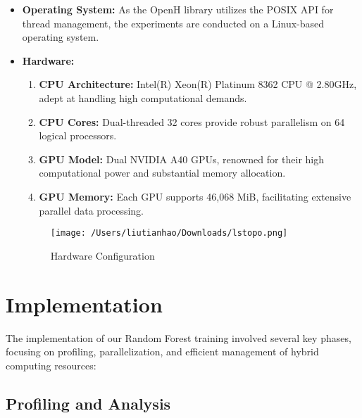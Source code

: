 \documentclass[11.5pt]{article}
\begin{document}
\begin{itemize}
    \item \textbf{Operating System:}
    As the OpenH library utilizes the POSIX API for thread management, the experiments are conducted on a Linux-based operating system.

    \item \textbf{Hardware:}
    \begin{enumerate}
        \item \textbf{CPU Architecture:} Intel(R) Xeon(R) Platinum 8362 CPU @ 2.80GHz, adept at handling high computational demands.
        
        \item \textbf{CPU Cores:} Dual-threaded 32 cores provide robust parallelism on 64 logical processors.
        
        \item \textbf{GPU Model:} Dual NVIDIA A40 GPUs, renowned for their high computational power and substantial memory allocation.
        
        \item \textbf{GPU Memory:} Each GPU supports 46,068 MiB, facilitating extensive parallel data processing.
    \end{enumerate}

    \begin{figure}[ht]
        \centering
        \texttt{[image: /Users/liutianhao/Downloads/lstopo.png]}
        \caption{Hardware Configuration}
        \label{fig:hardware}
    \end{figure}

\end{itemize}

\section{Implementation}
The implementation of our Random Forest training involved several key phases, focusing on profiling, parallelization, and efficient management of hybrid computing resources:

\subsection{Profiling and Analysis}
\end{document}
